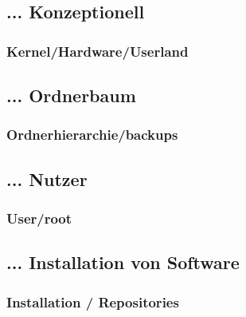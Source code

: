 \documentclass{beamer}
\begin{document}
        \subsection{... Konzeptionell}
            \begin{frame}
          		\frametitle{Kernel/Hardware/Userland}
        		\begin{minipage}{0.44\textwidth}
        		
        		\end{minipage}%
        		\begin{minipage}{0.54\textwidth}
        		
        		\end{minipage}
        	\end{frame}
        	
        \subsection{... Ordnerbaum}
            \begin{frame}
          		\frametitle{Ordnerhierarchie/backups}
        		\begin{minipage}{0.44\textwidth}
        		
        		\end{minipage}%
        		\begin{minipage}{0.54\textwidth}
        		
        		\end{minipage}
        	\end{frame}
        	
        \subsection{... Nutzer}
            \begin{frame}
          		\frametitle{User/root}
        		\begin{minipage}{0.44\textwidth}
        		
        		\end{minipage}%
        		\begin{minipage}{0.54\textwidth}
        		
        		\end{minipage}
        	\end{frame}
        	
        \subsection{... Installation von Software}
            \begin{frame}
          		\frametitle{Installation / Repositories}
        		\begin{minipage}{0.44\textwidth}
        		
        		\end{minipage}%
        		\begin{minipage}{0.54\textwidth}
        		
        		\end{minipage}
        	\end{frame}
\end{document}
